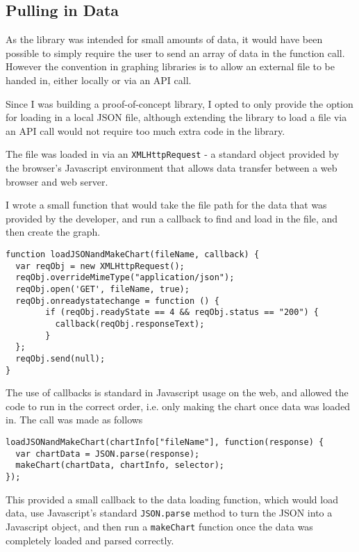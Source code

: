 \documentclass[ %
                    author={Aleena Baig},
                supervisor={Dr Simon Lock},
                    degree={BSc},
                     title={On Making Web Accessible Graphs},
                  subtitle={},
                      year={2019} ]{dissertation}
\begin{document}
\subsection{Pulling in Data}

As the library was intended for small amounts of data, it would have been possible to simply require the user to send an array of data in the function call. However the convention in graphing libraries is to allow an external file to be handed in, either locally or via an API call.

Since I was building a proof-of-concept library, I opted to only provide the option for loading in a local JSON file, although extending the library to load a file via an API call would not require too much extra code in the library.

The file was loaded in via an \texttt{XMLHttpRequest} - a standard object provided by the browser's Javascript environment that allows data transfer between a web browser and web server.


I wrote a small function that would take the file path for the data that was provided by the developer, and run a callback to find and load in the file, and then create the graph.

\begin{lstlisting}
function loadJSONandMakeChart(fileName, callback) {
  var reqObj = new XMLHttpRequest();
  reqObj.overrideMimeType("application/json");
  reqObj.open('GET', fileName, true);
  reqObj.onreadystatechange = function () {
        if (reqObj.readyState == 4 && reqObj.status == "200") {
          callback(reqObj.responseText);
        }
  };
  reqObj.send(null);
}
\end{lstlisting}

The use of callbacks is standard in Javascript usage on the web, and allowed the code to run in the correct order, i.e. only making the chart once data was loaded in. The call was made as follows

\begin{lstlisting}
loadJSONandMakeChart(chartInfo["fileName"], function(response) {
  var chartData = JSON.parse(response);
  makeChart(chartData, chartInfo, selector);
});
\end{lstlisting}

This provided a small callback to the data loading function, which would load data, use Javascript's standard \texttt{JSON.parse} method to turn the JSON into a Javascript object, and then run a \texttt{makeChart} function once the data was completely loaded and parsed correctly.
\end{document}
